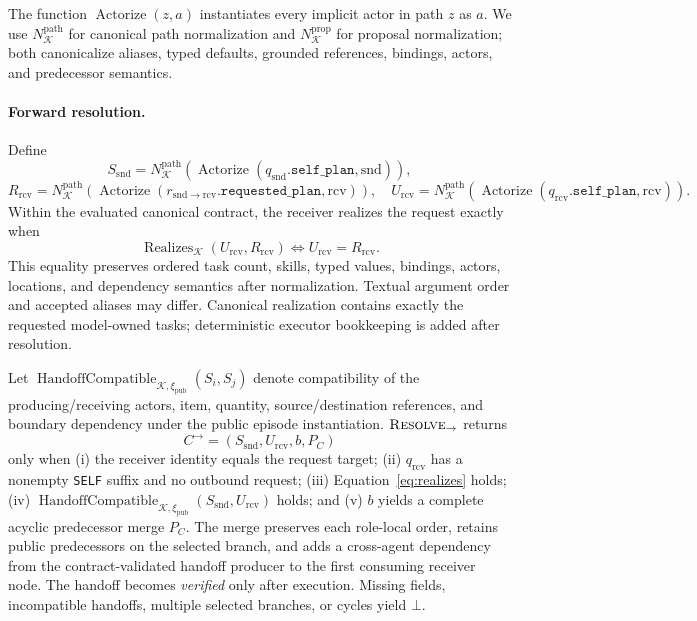 \documentclass[10pt]{article}
\newcommand{\artifact}[1]{\texttt{#1}}
\begin{document}
The function $\operatorname{Actorize}(z,a)$ instantiates every implicit actor in path $z$ as $a$. We use $N_{\mathcal K}^{\mathrm{path}}$ for canonical path normalization and $N_{\mathcal K}^{\mathrm{prop}}$ for proposal normalization; both canonicalize aliases, typed defaults, grounded references, bindings, actors, and predecessor semantics.

\paragraph{Forward resolution.}
Define
\[
S_{\mathrm{snd}}=N_{\mathcal K}^{\mathrm{path}}\!\left(\operatorname{Actorize}(q_{\mathrm{snd}}.\mathtt{self\_plan},\mathrm{snd})\right),
\]
\[
R_{\mathrm{rcv}}=N_{\mathcal K}^{\mathrm{path}}\!\left(\operatorname{Actorize}(r_{\mathrm{snd}\rightarrow\mathrm{rcv}}.\mathtt{requested\_plan},\mathrm{rcv})\right),
\quad
U_{\mathrm{rcv}}=N_{\mathcal K}^{\mathrm{path}}\!\left(\operatorname{Actorize}(q_{\mathrm{rcv}}.\mathtt{self\_plan},\mathrm{rcv})\right).
\]
Within the evaluated canonical contract, the receiver realizes the request exactly when
\begin{equation}
\operatorname{Realizes}_{\mathcal K}(U_{\mathrm{rcv}},R_{\mathrm{rcv}})
\iff U_{\mathrm{rcv}}=R_{\mathrm{rcv}}.
\label{eq:realizes}
\end{equation}
This equality preserves ordered task count, skills, typed values, bindings, actors, locations, and dependency semantics after normalization. Textual argument order and accepted aliases may differ. Canonical realization contains exactly the requested model-owned tasks; deterministic executor bookkeeping is added after resolution.

Let $\operatorname{HandoffCompatible}_{\mathcal K,\xi_{\mathrm{pub}}}(S_i,S_j)$ denote compatibility of the producing/receiving actors, item, quantity, source/destination references, and boundary dependency under the public episode instantiation. $\textsc{Resolve}_{\rightarrow}$ returns
\[
C^{\rightarrow}=(S_{\mathrm{snd}},U_{\mathrm{rcv}},b,P_C)
\]
only when (i) the receiver identity equals the request target; (ii) $q_{\mathrm{rcv}}$ has a nonempty \artifact{SELF} suffix and no outbound request; (iii) Equation~\ref{eq:realizes} holds; (iv) $\operatorname{HandoffCompatible}_{\mathcal K,\xi_{\mathrm{pub}}}(S_{\mathrm{snd}},U_{\mathrm{rcv}})$ holds; and (v) $b$ yields a complete acyclic predecessor merge $P_C$. The merge preserves each role-local order, retains public predecessors on the selected branch, and adds a cross-agent dependency from the contract-validated handoff producer to the first consuming receiver node. The handoff becomes \emph{verified} only after execution. Missing fields, incompatible handoffs, multiple selected branches, or cycles yield $\bot$.
\end{document}
